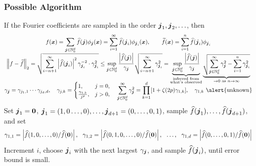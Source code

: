 \documentclass[11pt,compress,xcolor={usenames,dvipsnames},aspectratio=169]{beamer}
\begin{document}
\begin{frame}
\frametitle{Possible Algorithm}
\vspace{-3ex}
If the Fourier coefficients are sampled in the order $\boldsymbol{j}_1, \boldsymbol{j}_2, \ldots$, then 
\vspace{-1ex}
\begin{gather*}
f(\vx) = \sum_{\vj \in \natzero^d} \hf(\vj) \phi_{\vj}(\vx) =  \sum_{i =1}^{\infty} \hf(\vj_i) \phi_{\vj_i}(\vx), \qquad \tf(\vx) = \sum_{i=1}^{n} \hf(\vj_i) \phi_{\vj_i} \\[-1ex]
 \norm[2]{f - \tf} = 
\sqrt{\sum_{i = n+1}^{\infty} \abs{\hf(\vj_i)}^2 \gamma_{\vj_{i}}^{-2}  \cdot \gamma_{\vj_{i}}^2} \le 
\sup_{\vj  \in \natzero^d} \frac{\abs{\hf(\vj)}}{\gamma_{\vj}}  \sqrt{\sum_{i = n+1}^{\infty} \gamma_{\vj_{i}}^2}
= 
\underbrace{\sup_{\vj \in \natzero^d} \frac{\abs{\hf(\vj)}}{\gamma_{\vj}}}_{\substack{\text{inferred from} \\ \text{what's observed}}} \underbrace{\sqrt{\sum_{\vj  \in \natzero^d}^{\infty} \gamma_{\vj}^2 - \sum_{i = 1}^{n} \gamma_{\vj_{i}}^2} }_{\to 0 \text{ as } n \to \infty}
\\[-2ex]
\gamma_{\vj} = \gamma_{j_1,1} \cdots \gamma_{j_d,d},  \quad \gamma_{j,k} = \begin{cases}
1, & j = 0, \\
\frac{\gamma_{1,k}}{j^{p}}, & j > 0,
\end{cases}
\quad 
\sum_{\vj  \in \natzero^d}^{\infty} \gamma_{\vj}^2 = \prod_{k=1}^d [1 + \zeta(2p) \gamma_{1,k}], 
\quad \gamma_{1,k} \text{ \alert{unknown}}
\end{gather*}
Set $\boldsymbol{j}_1 = \boldsymbol{0}$, $\boldsymbol{j}_1 = (1, 0 \ldots, 0), \ldots, \boldsymbol{j}_{d+1}  = (0,\ldots, 0, 1)$, sample $\widehat{f}(\boldsymbol{j}_1), \ldots, \widehat{f}(\boldsymbol{j}_{d+1})$, and set
\[ 
\gamma_{1,1}  = \left \lvert \widehat{f}(1, 0 , \ldots, 0)/\widehat{f}(\boldsymbol{0}) \right \rvert,  \ \  \gamma_{1,2}  = \left \lvert \widehat{f}(0, 1, 0 , \ldots, 0)/\widehat{f}(\boldsymbol{0}) \right \rvert, \ \ \ldots, \ \  \gamma_{1,d}  = \left \lvert \widehat{f}( 0 , \ldots, 0,1)/\widehat{f}(\boldsymbol{0}) \right \rvert
\]
Increment $i$, choose $\boldsymbol{j}_i$ with the next largest $\gamma_{\boldsymbol{j}}$, and sample $\widehat{f}(\boldsymbol{j}_i)$, until error bound is small.

\end{frame}
\end{document}
